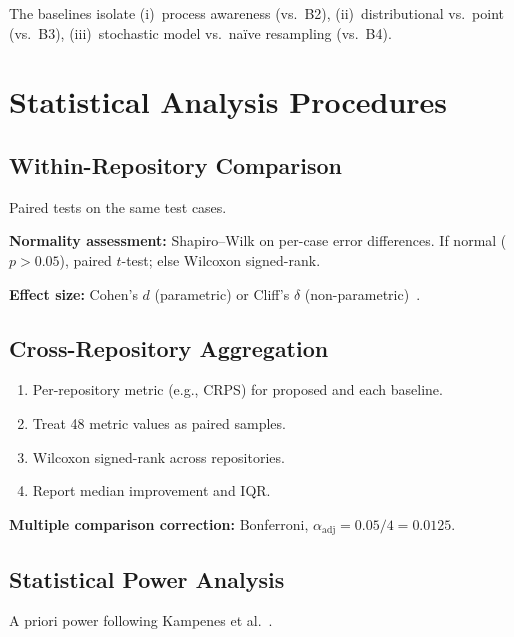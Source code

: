 The baselines isolate (i)~process awareness (vs.\ B2),
(ii)~distributional vs.\ point (vs.\ B3), (iii)~stochastic model vs.\
naïve resampling (vs.\ B4).


\section{Statistical Analysis Procedures}
\label{sec:statistical-analysis}

\subsection{Within-Repository Comparison}
\label{sec:within-repo}

Paired tests on the same test cases.

\textbf{Normality assessment:} Shapiro–Wilk on per-case error differences.
If normal ($p > 0.05$), paired $t$-test; else Wilcoxon signed-rank.

\textbf{Effect size:} Cohen's $d$ (parametric) or Cliff's $\delta$
(non-parametric)~\cite{kampenes2007systematic}.


\subsection{Cross-Repository Aggregation}
\label{sec:cross-repo-stats}

\begin{enumerate}
    \item Per-repository metric (e.g., CRPS) for proposed and each
    baseline.
    \item Treat 48 metric values as paired samples.
    \item Wilcoxon signed-rank across repositories.
    \item Report median improvement and IQR.
\end{enumerate}

\textbf{Multiple comparison correction:} Bonferroni,
$\alpha_{\text{adj}} = 0.05 / 4 = 0.0125$.


\subsection{Statistical Power Analysis}
\label{sec:power-analysis}

A priori power following
Kampenes et al.~\cite{kampenes2007systematic}.

